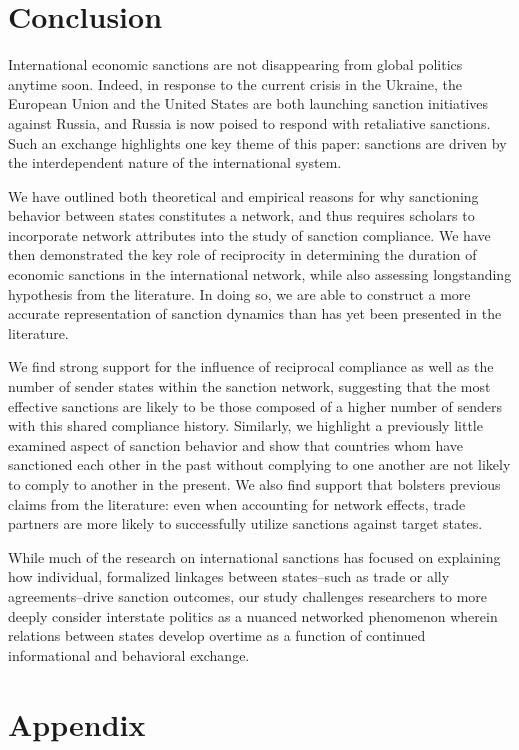 \section*{Conclusion}
\label{conclusion}

International economic sanctions are not disappearing from global politics anytime soon. Indeed, in response to the current crisis in the Ukraine, the European Union and the United States are both launching sanction initiatives against Russia, and Russia is now poised to respond with retaliative sanctions. Such an exchange highlights one key theme of this paper: sanctions are driven by the interdependent nature of the international system. 

We have outlined both theoretical and empirical reasons for why sanctioning behavior between states constitutes a network, and thus requires scholars to incorporate network attributes into the study of sanction compliance. We have then demonstrated the key role of reciprocity in determining the duration of economic sanctions in the international network, while also assessing longstanding hypothesis from the literature. In doing so, we are able to construct a more accurate representation of sanction dynamics than has yet been presented in the literature. 

We find strong support for the influence of reciprocal compliance as well as the number of sender states within the sanction network, suggesting that the most effective sanctions are likely to be those composed of a higher number of senders with this shared compliance history. Similarly, we highlight a previously little examined aspect of sanction behavior and show that countries whom have sanctioned each other in the past without complying to one another are not likely to comply to another in the present. We also find support that bolsters previous claims from the literature: even when accounting for network effects, trade partners are more likely to successfully utilize sanctions against target states.  

While much of the research on international sanctions has focused on explaining how individual, formalized linkages between states--such as trade or ally agreements--drive sanction outcomes, our study challenges researchers to more deeply consider interstate politics as a nuanced networked phenomenon wherein relations between states develop overtime as a function of continued informational and behavioral exchange. 


\newpage
\section*{Appendix}
\label{appendix}

